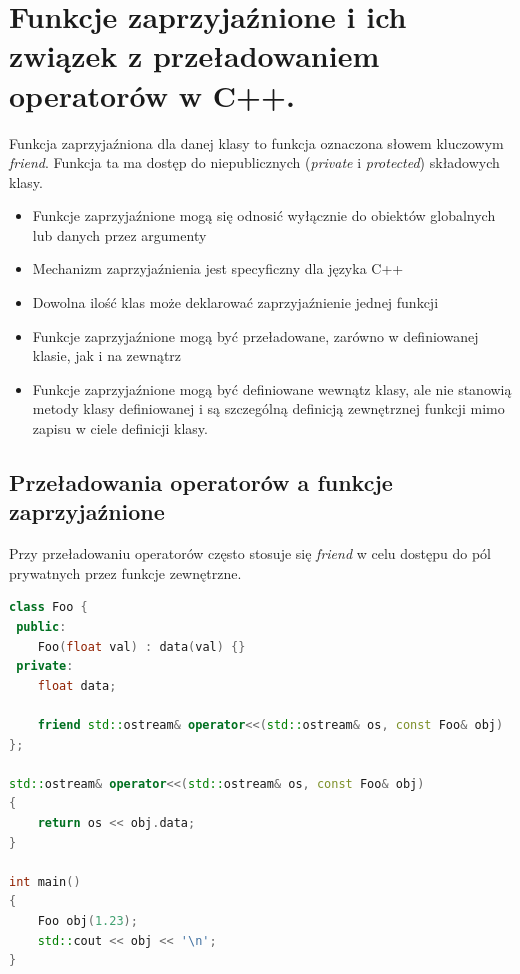 \documentclass[12pt]{article}
\begin{document}
    \newpage
    
    \section{Funkcje zaprzyjaźnione i ich związek z przeładowaniem operatorów w C++.}
    \begin{definition}
        Funkcja zaprzyjaźniona dla danej klasy to funkcja oznaczona słowem kluczowym
        \textit{friend}. Funkcja ta ma dostęp do niepublicznych (\textit{private} i
        \textit{protected}) składowych klasy.
    \end{definition}

    \begin{itemize}
        \item Funkcje zaprzyjaźnione mogą się odnosić wyłącznie do obiektów
            globalnych lub danych przez argumenty
        \item Mechanizm zaprzyjaźnienia jest specyficzny dla języka C++
        \item Dowolna ilość klas może deklarować zaprzyjaźnienie jednej funkcji
        \item Funkcje zaprzyjaźnione mogą być przeładowane, zarówno w definiowanej klasie, jak i na zewnątrz
        \item Funkcje zaprzyjaźnione mogą być definiowane wewnątz klasy, ale
            nie stanowią metody klasy definiowanej i są szczególną definicją
            zewnętrznej funkcji mimo zapisu w ciele definicji klasy.
    \end{itemize}

    \newpage
    \subsection{Przeładowania operatorów a funkcje zaprzyjaźnione}
    Przy przeładowaniu operatorów często stosuje się \textit{friend} w celu dostępu do pól prywatnych przez funkcje zewnętrzne.


        \begin{lstlisting}[language=C++]
class Foo {
 public:
    Foo(float val) : data(val) {}
 private:
    float data;
 
    friend std::ostream& operator<<(std::ostream& os, const Foo& obj)
};

std::ostream& operator<<(std::ostream& os, const Foo& obj) 
{
    return os << obj.data;
}

int main()
{
    Foo obj(1.23);
    std::cout << obj << '\n';
}
        \end{lstlisting}
\end{document}
